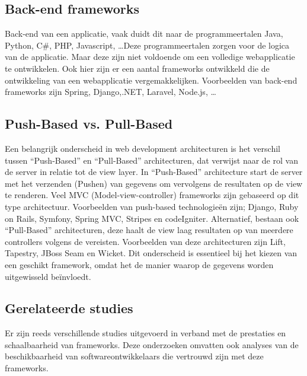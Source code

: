 \documentclass{hogent-article}
\begin{document}
\subsection{Back-end frameworks}%
\label{sub:backend_frameworks}
Back-end van een applicatie, vaak duidt dit naar de programmeertalen Java, Python, C\#, PHP, Ja\-va\-script, \ldots Deze programmeertalen zorgen voor de logica van de applicatie. Maar deze zijn niet voldoende om een volledige webapplicatie te ontwikkelen. Ook hier zijn er een aantal frameworks ontwikkeld die de ontwikkeling van een webapplicatie vergemakkelijken.
Voorbeelden van back-end frameworks zijn Spring, Django,.NET, Laravel, Node.js, \ldots\autocite{Kaluza2019}

\subsection{Push-Based vs. Pull-Based}%
Een belangrijk onderscheid in web development architecturen is het verschil tussen ``Push-Based'' en ``Pull-Based'' architecturen, dat verwijst naar de rol van de server in relatie tot de view layer.\autocite{Lomas2022}
\bigbreak
In ``Push-Based'' architecture start de server met het verzenden (Pushen) van gegevens om vervolgens de resultaten op de view te renderen. Veel MVC (Model-view-controller) frameworks zijn gebaseerd op dit type architectuur. Voorbeelden van push-based technologieën zijn; Django, Ruby on Rails, Symfony, Spring MVC, Stripes en codeIgniter.
\bigbreak
Alternatief, bestaan ook ``Pull-Based'' architecturen, deze haalt de view laag resultaten op van meerdere controllers volgens de vereisten. Voorbeelden van deze architecturen zijn Lift, Tapestry, JBoss Seam en Wicket.
\bigbreak
Dit onderscheid is essentieel bij het kiezen van een geschikt framework, omdat het de manier waarop de gegevens worden uitgewisseld beïnvloedt.

\subsection{Ge\-rel\-at\-eerde studies}%
\label{sub:Gerelateerde_studies}
Er zijn reeds verschillende studies uitgevoerd in verband met de pre\-sta\-ties en schaalbaarheid van frameworks\autocite{Daityari2023}.  Deze onderzoeken omvatten ook analyses van de beschikbaarheid van soft\-ware\-ont\-wik\-kel\-aars die vertrouwd zijn met deze frameworks.
\end{document}

